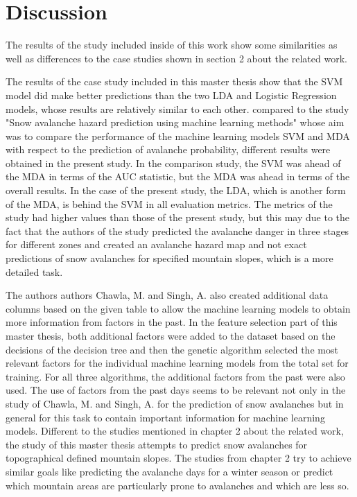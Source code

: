 \documentclass[../masterarbeit.tex]{subfiles}
\begin{document}
\section{Discussion}
The results of the study included inside of this work show some similarities as well as differences to the case studies shown in section 2 about the related work. 

The results of the case study included in this master thesis show that the SVM model did make better predictions than the two LDA and Logistic Regression models, whose results are relatively similar to each other. compared to the study "Snow avalanche hazard prediction using machine learning methods" \textcite[]{Bahram:2019} whose aim was to compare the performance of the machine learning models SVM and MDA with respect to the prediction of avalanche probability, different results were obtained in the present study. In the comparison study, the SVM was ahead of the MDA in terms of the AUC statistic, but the MDA was ahead in terms of the overall results. In the case of the present study, the LDA, which is another form of the MDA, is behind the SVM in all evaluation metrics. The metrics of the study had higher values than those of the present study, but this may due to the fact that the authors of the study predicted the avalanche danger in three stages for different zones and created an avalanche hazard map and not exact predictions of snow avalanches for specified mountain slopes, which is a more detailed task. 

The authors authors Chawla, M. and Singh, A. \textcite[]{nhess-2021-106} also created additional data columns based on the given table to allow the machine learning models to obtain more information from factors in the past. In the feature selection part of this master thesis, both additional factors were added to the dataset based on the decisions of the decision tree and then the genetic algorithm selected the most relevant factors for the individual machine learning models from the total set for training. For all three algorithms, the additional factors from the past were also used. The use of factors from the past days seems to be relevant not only in the study of Chawla, M. and Singh, A. \textcite[]{nhess-2021-106} for the prediction of snow avalanches but in general for this task to contain important information for machine learning models.
Different to the studies mentioned in chapter 2 about the related work, the study of this master thesis attempts to predict snow avalanches for topographical defined mountain slopes. The studies from chapter 2 try to achieve similar goals like predicting the avalanche days for a winter season or predict which mountain areas are particularly prone to avalanches and which are less so. 
\end{document}
